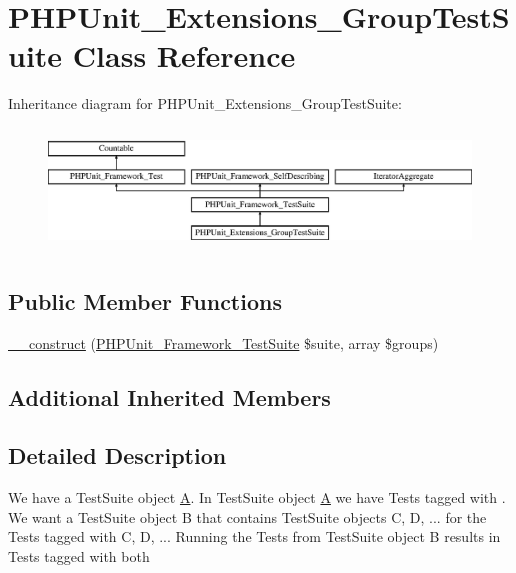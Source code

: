 \hypertarget{class_p_h_p_unit___extensions___group_test_suite}{}\section{P\+H\+P\+Unit\+\_\+\+Extensions\+\_\+\+Group\+Test\+Suite Class Reference}
\label{class_p_h_p_unit___extensions___group_test_suite}
Inheritance diagram for P\+H\+P\+Unit\+\_\+\+Extensions\+\_\+\+Group\+Test\+Suite\+:\begin{figure}[H]
\begin{center}
\leavevmode
\includegraphics[height=3.303835cm]{class_p_h_p_unit___extensions___group_test_suite}
\end{center}
\end{figure}
\subsection*{Public Member Functions}
\begin{DoxyCompactItemize}
\item 
\mbox{\hyperlink{class_p_h_p_unit___extensions___group_test_suite_a3f79867721bf8751410dab810ee6f7ec}{\+\_\+\+\_\+construct}} (\mbox{\hyperlink{class_p_h_p_unit___framework___test_suite}{P\+H\+P\+Unit\+\_\+\+Framework\+\_\+\+Test\+Suite}} \$suite, array \$groups)
\end{DoxyCompactItemize}
\subsection*{Additional Inherited Members}


\subsection{Detailed Description}
We have a Test\+Suite object \mbox{\hyperlink{class_a}{A}}. In Test\+Suite object \mbox{\hyperlink{class_a}{A}} we have Tests tagged with . We want a Test\+Suite object B that contains Test\+Suite objects C, D, ... for the Tests tagged with  C,  D, ... Running the Tests from Test\+Suite object B results in Tests tagged with both


